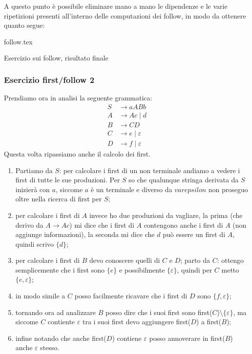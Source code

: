 \documentclass[class=book, crop=false, oneside, 12pt]{standalone}
\begin{document}
A questo punto è possibile eliminare mano a mano le dipendenze e le varie ripetizioni presenti all'interno delle computazioni dei follow, in modo da ottenere quanto segue: 

\begin{table}[H]
	\centering
	{follow.tex}
    \caption{Esercizio sui follow, risultato finale}
    \label{follow}
\end{table}

\subsubsection{Esercizio first/follow 2}
\label{first-folllow-ex-2}
Prendiamo ora in analisi la seguente grammatica:
\begin{align*}
       S &\to aABb \\
       A &\to Ac \mid d \\
       B &\to CD \\
       C &\to e \mid \varepsilon \\
       D &\to f \mid \varepsilon
\end{align*}
Questa volta ripassiamo anche il calcolo dei first.
\begin{enumerate}
    \item Partiamo da \(S\): per calcolare i first di un non terminale andiamo a vedere i first di tutte le sue produzioni. Per \(S\) so che qualunque stringa derivata da \(S\) inizierà con \(a\), siccome \(a\) è un terminale e diverso da \(varepsilon\) non proseguo oltre nella ricerca di first per \(S\);
    \item per calcolare i first di \(A\) invece ho due produzioni da vagliare, la prima (che derivo da \(A \to Ac\)) mi dice che i first di \(A\) contengono anche i first di \(A\) (non aggiunge informazioni), la seconda mi dice che \(d\) può essere un first di \(A\), quindi scrivo \(\{d\}\);
    \item per calcolare i first di \(B\) devo conoscere quelli di \(C\) e \(D\); parto da \(C\): ottengo semplicemente che i first sono \(\{e\}\) e possibilmente \(\{\varepsilon\}\), quindi per \(C\) metto \(\{e, \varepsilon\}\);
    \item in modo simile a \(C\) posso facilmente ricavare che i first di \(D\) sono \(\{f, \varepsilon\}\);
    \item tornando ora ad analizzare \(B\) posso dire che i suoi first sono first(\(C\))\( \setminus \{\varepsilon\}\), ma siccome \(C\) contiente \(\varepsilon\) tra i suoi first devo aggiungere first(\(D\)) a first(\(B\));
    \item infine notando che anche first(\(D\)) contiene \(\varepsilon\) posso annoverare in first(\(B\)) anche \(\varepsilon\) stesso.    
\end{enumerate}
\end{document}
